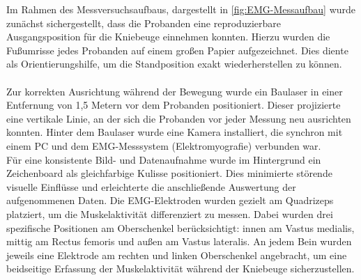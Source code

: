 Im Rahmen des Messversuchsaufbaus, dargestellt in \autoref{fig:EMG-Messaufbau} wurde zunächst sichergestellt, dass die Probanden eine reproduzierbare Ausgangsposition für die Kniebeuge einnehmen konnten.
Hierzu wurden die Fußumrisse jedes Probanden auf einem großen Papier aufgezeichnet.
Dies diente als Orientierungshilfe, um die Standposition exakt wiederherstellen zu können.
\\
\\
Zur korrekten Ausrichtung während der Bewegung wurde ein Baulaser in einer Entfernung von 1,5 Metern vor dem Probanden positioniert. Dieser projizierte eine vertikale Linie, an der sich die Probanden vor jeder Messung neu ausrichten konnten. Hinter dem Baulaser wurde eine Kamera installiert, die synchron mit einem PC und dem EMG-Messsystem (Elektromyografie) verbunden war.
\\
Für eine konsistente Bild- und Datenaufnahme wurde im Hintergrund ein Zeichenboard als gleichfarbige Kulisse positioniert. Dies minimierte störende visuelle Einflüsse und erleichterte die anschließende Auswertung der aufgenommenen Daten.
Die EMG-Elektroden wurden gezielt am Quadrizeps platziert, um die Muskelaktivität differenziert zu messen. Dabei wurden drei spezifische Positionen am Oberschenkel berücksichtigt: innen am Vastus medialis, mittig am Rectus femoris und außen am Vastus lateralis. An jedem Bein wurden jeweils eine Elektrode am rechten und linken Oberschenkel angebracht, um eine beidseitige Erfassung der Muskelaktivität während der Kniebeuge sicherzustellen.

